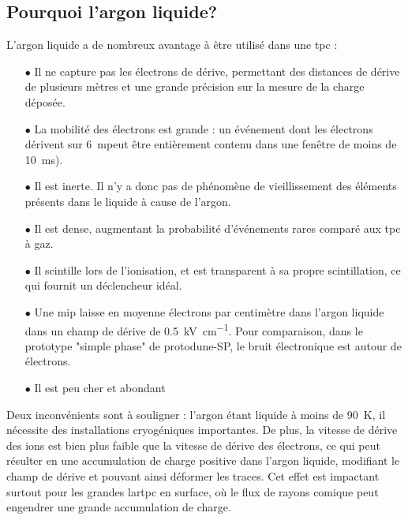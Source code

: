     \subsection{Pourquoi l'argon liquide?}
      L'argon liquide a de nombreux avantage à être utilisé dans une \gls{tpc}\cite{Rubbia1977} :
      \begin{itemize}
        \item[$\bullet$] Il ne capture pas les électrons de dérive, permettant des distances de dérive de plusieurs mètres et une grande précision sur la mesure de la charge déposée.
        \item[$\bullet$] La mobilité des électrons est grande : un événement dont les électrons dérivent sur \SI{6}{\meter}peut être entièrement contenu dans une fenêtre de moins de \SI{10}{\milli\second}).
        \item[$\bullet$] Il est inerte. Il n'y a donc pas de phénomène de vieillissement des éléments présents dans le liquide à cause de l'argon.
        \item[$\bullet$] Il est dense, augmentant la probabilité d'événements rares comparé aux \gls{tpc} à gaz.
        \item[$\bullet$] Il scintille lors de l'ionisation, et est transparent à sa propre scintillation, ce qui fournit un déclencheur idéal.
        \item[$\bullet$] Une \gls{mip} laisse en moyenne  électrons par centimètre dans l'argon liquide dans un champ de dérive de \SI{0.5}{\kilo\volt\per\centi\meter}. Pour comparaison, dans le prototype "simple phase" de proto\gls{dune}-SP, le bruit électronique est autour de  électrons.
        \item[$\bullet$] Il est peu cher et abondant
      \end{itemize}
      Deux inconvénients sont à souligner : l'argon étant liquide à moins de \SI{90}{\kelvin}, il nécessite des installations cryogéniques importantes. De plus, la vitesse de dérive des ions est bien plus faible que la vitesse de dérive des électrons, ce qui peut résulter en une accumulation de charge positive dans l'argon liquide, modifiant le champ de dérive et pouvant ainsi déformer les traces. Cet effet est impactant surtout pour les grandes \gls{lartpc} en surface, où le flux de rayons comique peut engendrer une grande accumulation de charge.

